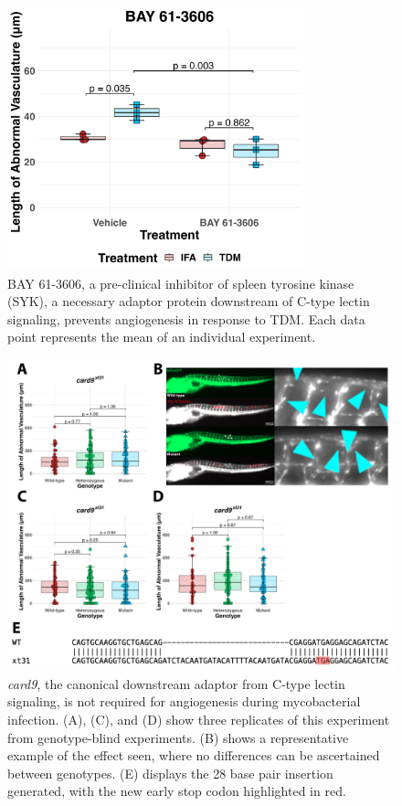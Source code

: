 \begin{figure}
\centering
\includegraphics[height=3in]{images/syk_tdm_120522.png}
\caption[Chemical inhibition of SYK prevents TDM\hyp{}mediated Angiogenesis]{BAY 61\hyp{}3606, a pre\hyp{}clinical inhibitor of spleen tyrosine kinase (SYK), a necessary adaptor protein downstream of C\hyp{}type lectin signaling, prevents angiogenesis in response to TDM. Each data point represents the mean of an individual experiment.}
\label{figure:syk}
\end{figure}

\begin{figure}
\centering
\includegraphics[width=\textwidth]{images/card9.pdf}
\caption[\textit{card9} is dispensable for angiogenesis]{\textit{card9}, the canonical downstream adaptor from C\hyp{}type lectin signaling, is not required for angiogenesis during mycobacterial infection. (A), (C), and (D) show three replicates of this experiment from genotype\hyp{}blind experiments. (B) shows a representative example of the effect seen, where no differences can be ascertained between genotypes. (E) displays the 28 base pair insertion generated, with the new early stop codon highlighted in red.}
\label{figure:card9}
\end{figure}

